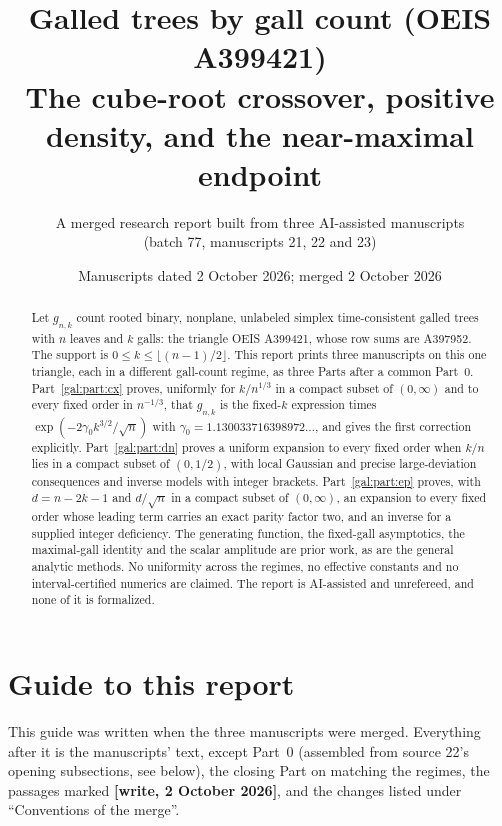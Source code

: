 \documentclass[11pt,letterpaper]{article}
\title{\bfseries Galled trees by gall count (OEIS A399421)\\[4pt]
\large The cube-root crossover, positive density, and the near-maximal endpoint}
\author{A merged research report built from three AI-assisted manuscripts\\
(batch 77, manuscripts 21, 22 and 23)}
\date{Manuscripts dated 2 October 2026; merged 2 October 2026}
\numberwithin{equation}{section}
\theoremstyle{definition}\newtheorem{definition}[theorem]{Definition}
\theoremstyle{remark}\newtheorem{remark}[theorem]{Remark}
\begin{document}
\hypersetup{pageanchor=false}
\maketitle
\thispagestyle{empty}
\begin{abstract}
Let $g_{n,k}$ count rooted binary, nonplane, unlabeled simplex time-consistent galled trees with $n$ leaves and $k$ galls: the triangle OEIS A399421, whose row sums are A397952. The support is $0\le k\le\lfloor(n-1)/2\rfloor$. This report prints three manuscripts on this one triangle, each in a different gall-count regime, as three Parts after a common Part~0. Part~\ref{gal:part:cx} proves, uniformly for $k/n^{1/3}$ in a compact subset of $(0,\infty)$ and to every fixed order in $n^{-1/3}$, that $g_{n,k}$ is the fixed-$k$ expression times $\exp(-2\gamma_0k^{3/2}/\sqrt n)$ with $\gamma_0=1.130033716398972\ldots$, and gives the first correction explicitly. Part~\ref{gal:part:dn} proves a uniform expansion to every fixed order when $k/n$ lies in a compact subset of $(0,1/2)$, with local Gaussian and precise large-deviation consequences and inverse models with integer brackets. Part~\ref{gal:part:ep} proves, with $d=n-2k-1$ and $d/\sqrt n$ in a compact subset of $(0,\infty)$, an expansion to every fixed order whose leading term carries an exact parity factor two, and an inverse for a supplied integer deficiency. The generating function, the fixed-gall asymptotics, the maximal-gall identity and the scalar amplitude are prior work, as are the general analytic methods. No uniformity across the regimes, no effective constants and no interval-certified numerics are claimed. The report is AI-assisted and unrefereed, and none of it is formalized.
\end{abstract}
\setcounter{tocdepth}{2}
{\setlength{\parskip}{0pt}\tableofcontents}
\newpage
\hypersetup{pageanchor=true}

\section*{Guide to this report}
\label{gal:guide}
This guide was written when the three manuscripts were merged. Everything after it is the manuscripts' text, except Part~0 (assembled from source 22's opening subsections, see below), the closing Part on matching the regimes, the passages marked \textbf{[write, 2 October 2026]}, and the changes listed under ``Conventions of the merge''.
\end{document}
